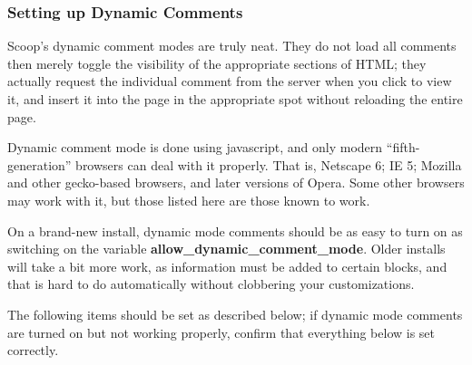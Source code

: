 \subsubsection{Setting up Dynamic Comments}
\label{comments-dynamic}

Scoop's dynamic comment modes are truly neat.  They do not load all comments then merely toggle the visibility of the appropriate sections of HTML; they actually request the individual comment from the server when you click to view it, and insert it into the page in the appropriate spot without reloading the entire page.

Dynamic comment mode is done using javascript, and only modern ``fifth-generation'' browsers can deal with it properly.  That is, Netscape \latexhtml{$>$}{>} 6; IE \latexhtml{$>$}{>} 5; Mozilla and other gecko-based browsers, and later versions of Opera. Some other browsers may work with it, but those listed here are those known to work.

On a brand-new install, dynamic mode comments should be as easy to turn on as switching on the variable {\bf allow\_dynamic\_comment\_mode}.  Older installs will take a bit more work, as information must be added to certain blocks, and that is hard to do automatically without clobbering your customizations.

The following items should be set as described below; if dynamic mode comments are turned on but not working properly, confirm that everything below is set correctly.

